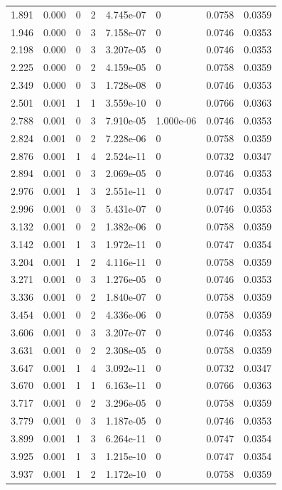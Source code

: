 \documentclass[preview]{standalone}
\begin{document}
{{\begin{tabular}{L{1.2cm}C{1.2cm} C{0.3cm}C{0.5cm} C{1.4cm}C{1.4cm} C{1.4cm}C{1.4cm}}
  1.891  &  0.000  & 0     &  2 &  4.745e-07  & 0  & 0.0758 &  0.0359   \\ 
  1.946  &  0.000  & 0     &  3 &  7.158e-07  & 0  & 0.0746 &  0.0353   \\ 
  2.198  &  0.000  & 0     &  3 &  3.207e-05  & 0  & 0.0746 &  0.0353   \\ 
  2.225  &  0.000  & 0     &  2 &  4.159e-05  & 0  & 0.0758 &  0.0359   \\ 
  2.349  &  0.000  & 0     &  3 &  1.728e-08  & 0  & 0.0746 &  0.0353   \\ 
  2.501  &  0.001  & 1     &  1 &  3.559e-10  & 0  & 0.0766 &  0.0363   \\ 
  2.788  &  0.001  & 0     &  3 &  7.910e-05  & 1.000e-06  & 0.0746 &  0.0353   \\ 
  2.824  &  0.001  & 0     &  2 &  7.228e-06  & 0  & 0.0758 &  0.0359   \\ 
  2.876  &  0.001  & 1     &  4 &  2.524e-11  & 0  & 0.0732 &  0.0347   \\ 
  2.894  &  0.001  & 0     &  3 &  2.069e-05  & 0  & 0.0746 &  0.0353   \\ 
  2.976  &  0.001  & 1     &  3 &  2.551e-11  & 0  & 0.0747 &  0.0354   \\ 
  2.996  &  0.001  & 0     &  3 &  5.431e-07  & 0  & 0.0746 &  0.0353   \\ 
  3.132  &  0.001  & 0     &  2 &  1.382e-06  & 0  & 0.0758 &  0.0359   \\ 
  3.142  &  0.001  & 1     &  3 &  1.972e-11  & 0  & 0.0747 &  0.0354   \\ 
  3.204  &  0.001  & 1     &  2 &  4.116e-11  & 0  & 0.0758 &  0.0359   \\ 
  3.271  &  0.001  & 0     &  3 &  1.276e-05  & 0  & 0.0746 &  0.0353   \\ 
  3.336  &  0.001  & 0     &  2 &  1.840e-07  & 0  & 0.0758 &  0.0359   \\ 
  3.454  &  0.001  & 0     &  2 &  4.336e-06  & 0  & 0.0758 &  0.0359   \\ 
  3.606  &  0.001  & 0     &  3 &  3.207e-07  & 0  & 0.0746 &  0.0353   \\ 
  3.631  &  0.001  & 0     &  2 &  2.308e-05  & 0  & 0.0758 &  0.0359   \\ 
  3.647  &  0.001  & 1     &  4 &  3.092e-11  & 0  & 0.0732 &  0.0347   \\ 
  3.670  &  0.001  & 1     &  1 &  6.163e-11  & 0  & 0.0766 &  0.0363   \\ 
  3.717  &  0.001  & 0     &  2 &  3.296e-05  & 0  & 0.0758 &  0.0359   \\ 
  3.779  &  0.001  & 0     &  3 &  1.187e-05  & 0  & 0.0746 &  0.0353   \\ 
  3.899  &  0.001  & 1     &  3 &  6.264e-11  & 0  & 0.0747 &  0.0354   \\ 
  3.925  &  0.001  & 1     &  3 &  1.215e-10  & 0  & 0.0747 &  0.0354   \\ 
  3.937  &  0.001  & 1     &  2 &  1.172e-10  & 0  & 0.0758 &  0.0359   \\ 
\hline 
\end{tabular} 

}}
\end{document}
